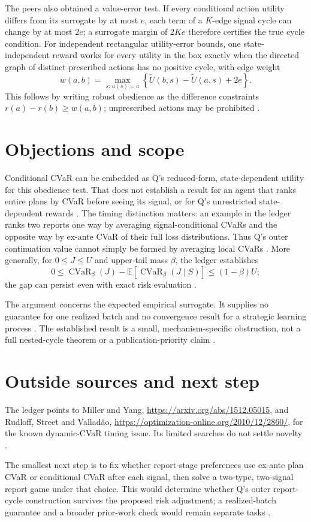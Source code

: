 \documentclass{article}
\begin{document}
The peers also obtained a value-error test. If every conditional action utility differs from its surrogate by at most \(e\), each term of a \(K\)-edge signal cycle can change by at most \(2e\); a surrogate margin of \(2Ke\) therefore certifies the true cycle condition. For independent rectangular utility-error bounds, one state-independent reward works for every utility in the box exactly when the directed graph of distinct prescribed actions has no positive cycle, with edge weight
\[
w(a,b)=
\max_{s:\,a(s)=a}
\left\{\widetilde U(b,s)-\widetilde U(a,s)+2e\right\}.
\]
This follows by writing robust obedience as the difference constraints \(r(a)-r(b)\geq w(a,b)\); unprescribed actions may be prohibited .

\section{Objections and scope}

Conditional CVaR can be embedded as Q's reduced-form, state-dependent utility for this obedience test. That does not establish a result for an agent that ranks entire plans by CVaR before seeing its signal, or for Q's unrestricted state-dependent rewards . The timing distinction matters: an example in the ledger ranks two reports one way by averaging signal-conditional CVaRs and the opposite way by ex-ante CVaR of their full loss distributions. Thus Q's outer continuation value cannot simply be formed by averaging local CVaRs . More generally, for \(0\leq J\leq U\) and upper-tail mass \(\beta\), the ledger establishes
\[
0\leq
\operatorname{CVaR}_{\beta}(J)
-\mathbb E\!\left[\operatorname{CVaR}_{\beta}(J\mid S)\right]
\leq(1-\beta)U;
\]
the gap can persist even with exact risk evaluation .

The argument concerns the expected empirical surrogate. It supplies no guarantee for one realized batch and no convergence result for a strategic learning process . The established result is a small, mechanism-specific obstruction, not a full nested-cycle theorem or a publication-priority claim .

\section{Outside sources and next step}

The ledger points to Miller and Yang, \url{https://arxiv.org/abs/1512.05015}, and Rudloff, Street and Valladão, \url{https://optimization-online.org/2010/12/2860/}, for the known dynamic-CVaR timing issue. Its limited searches do not settle novelty .

The smallest next step is to fix whether report-stage preferences use ex-ante plan CVaR or conditional CVaR after each signal, then solve a two-type, two-signal report game under that choice. This would determine whether Q's outer report-cycle construction survives the proposed risk adjustment; a realized-batch guarantee and a broader prior-work check would remain separate tasks .
\end{document}
